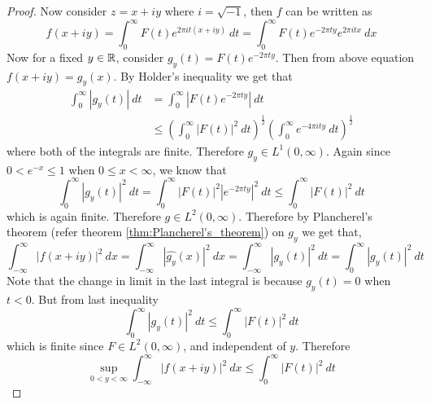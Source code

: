 \begin{proof}
  Now consider $z=x+iy$ where $i = \sqrt{-1}$, then $f$ can be written as $$f(x+iy) = \int_0^\infty F(t)e^{2\pi i t (x+iy)}\ dt = \int_0^\infty F(t)e^{-2\pi ty}e^{2\pi i tx} \ dx$$ 
  Now for a fixed $y \in \mathbb R$, consider $g_y(t) = F(t)e^{-2\pi ty}$. Then from above equation $f(x+iy) = \widehat{g_y}(x)$. By Holder's inequality we get that 
  \begin{align*}
    \int_0^\infty |g_y(t)| \ dt &= \int_0^\infty \left|F(t)e^{-2\pi ty}\right| \ dt \\
    &\le \left(\int_0^\infty \left|F(t)\right|^2 \ dt \right)^{\frac{1}{2}} \left(\int_0^\infty e^{-4\pi ity} \ dt \right)^{\frac{1}{2}}
  \end{align*}
  where both of the integrals are finite. Therefore $g_y \in L^1(0, \infty)$. Again since $0<e^{-x}\le1$ when $0\le x<\infty$, we know that $$\int_0^\infty |g_y(t)|^2 \ dt = \int_0^\infty \left|F(t)\right|^2 \left| e^{-2\pi ty} \right|^2 \ dt \le \int_0^\infty \left|F(t)\right|^2 \ dt$$
  which is again finite. Therefore $g\in L^2(0, \infty)$. Therefore by Plancherel's theorem (refer theorem \ref{thm:Plancherel's_theorem}) on $g_y$ we get that, $$\int_{-\infty}^{\infty}\left|f(x+iy)\right|^2 \ dx = \int_{-\infty}^{\infty} \left|\widehat{g_y}(x)\right|^2 \ dx= \int_{-\infty}^{\infty} \left|g_y(t)\right|^2 \ dt = \int_0^\infty \left|g_y(t)\right|^2 \ dt $$
Note that the change in limit in the last integral is because $g_y(t) = 0$ when $t < 0$. But from last inequality $$\int_0^\infty \left|g_y(t)\right|^2 \ dt \le \int_0^\infty \left|F(t)\right|^2 \ dt$$
  which is finite since $F \in L^2(0, \infty)$, and independent of $y$. Therefore $$\sup_{0<y<\infty} \int_{-\infty}^\infty \left|f(x+iy)\right|^2 \ dx \le \int_0^\infty \left|F(t)\right|^2 \ dt $$
\end{proof}

